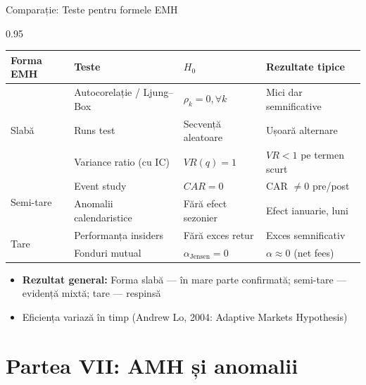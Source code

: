 \documentclass[9pt, aspectratio=169, t]{beamer}
\begin{document}
\begin{frame}[shrink=15]{Comparație: Teste pentru formele EMH}
\begin{cminipage}{0.95\textwidth}
\renewcommand{\arraystretch}{1.2}
\begin{center}
\footnotesize
\begin{tabular}{llll}
\toprule
\textbf{Forma EMH} & \textbf{Teste} & \textbf{$H_0$} & \textbf{Rezultate tipice} \\
\midrule
\multirow{3}{*}{Slabă} & Autocorelație / Ljung--Box & $\rho_k = 0, \forall k$ & Mici dar semnificative \\
 & Runs test & Secvență aleatoare & Ușoară alternare \\
 & Variance ratio (cu IC) & $VR(q) = 1$ & $VR < 1$ pe termen scurt \\
\midrule
\multirow{2}{*}{Semi-tare} & Event study & $CAR = 0$ & CAR $\neq 0$ pre/post \\
 & Anomalii calendaristice & Fără efect sezonier & Efect ianuarie, luni \\
\midrule
\multirow{2}{*}{Tare} & Performanța insiders & Fără exces retur & Exces semnificativ \\
 & Fonduri mutual & $\alpha_{\text{Jensen}} = 0$ & $\alpha \approx 0$ (net fees) \\
\bottomrule
\end{tabular}
\end{center}

\vspace{0.2cm}
\begin{itemize}\setlength{\itemsep}{0pt}
    \item \textbf{Rezultat general:} Forma slabă --- în mare parte confirmată; semi-tare --- evidență mixtă; tare --- respinsă
    \item Eficiența variază în timp (Andrew Lo, 2004: Adaptive Markets Hypothesis)
\end{itemize}
\end{cminipage}
\end{frame}

\section{Partea VII: AMH și anomalii}
\end{document}
